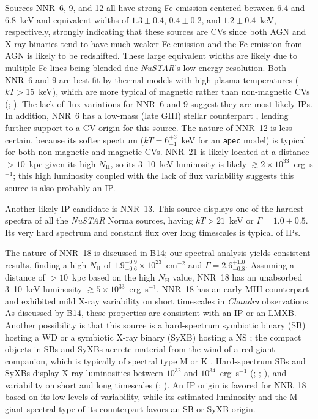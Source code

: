 \documentclass[iop,revtex4]{emulateapj}
\begin{document}
Sources NNR~6, 9, and 12 all have strong Fe emission centered between 6.4 and 6.8~keV and equivalent widths of $1.3\pm0.4$, $0.4\pm0.2$, and $1.2\pm0.4$~keV, respectively, strongly indicating that these sources are CVs since both AGN and X-ray binaries tend to have much weaker Fe emission and the Fe emission from AGN is likely to be redshifted.  These large equivalent widths are likely due to multiple Fe lines being blended due \textit{NuSTAR}'s low energy resolution.  Both NNR~6 and 9 are best-fit by thermal models with high plasma temperatures ($kT>15$~keV), which are more typical of magnetic rather than non-magnetic CVs (\citealt{landi09}; \citealt{xu16}).  The lack of flux variations for NNR~6 and 9 suggest they are most likely IPs.  In addition, NNR~6 has a low-mass (late GIII) stellar counterpart \citep{rahoui14}, lending further support to a CV origin for this source.  The nature of NNR~12 is less certain, because its softer spectrum ($kT = 6^{+3}_{-1}$~keV for an \texttt{apec} model) is typical for both non-magnetic and magnetic CVs.  NNR~21 is likely located at a distance $>10$~kpc given its high $N_{\mathrm{H}}$, so its 3--10~keV luminosity is likely $\gtrsim2\times10^{33}$~erg~s$^{-1}$; this high luminosity coupled with the lack of flux variability suggests this source is also probably an IP. \par   
Another likely IP candidate is NNR~13.  This source displays one of the hardest spectra of all the \textit{NuSTAR} Norma sources, having $kT>21$~keV or $\Gamma=1.0\pm0.5$.  Its very hard spectrum and constant flux over long timescales is typical of IPs. \par  
The nature of NNR~18 is discussed in B14; our spectral analysis yields consistent results, finding a high $N_{\mathrm{H}}$ of $1.9^{+0.9}_{-0.6}\times10^{23}$~cm$^{-2}$ and $\Gamma=2.6^{+1.0}_{-0.8}$.  Assuming a distance of $>10$~kpc based on the high $N_{\mathrm{H}}$ value, NNR~18 has an unabsorbed 3--10~keV luminosity $\gtrsim5\times10^{33}$~erg~s$^{-1}$.  NNR~18 has an early MIII counterpart and exhibited mild X-ray variability on short timescales in \textit{Chandra} observations.  As discussed by B14, these properties are consistent with an IP or an LMXB.  Another possibility is that this source is a hard-spectrum symbiotic binary (SB) hosting a WD or a symbiotic X-ray binary (SyXB) hosting a NS \citep{luna13}; the compact objects in SBs and SyXBs accrete material from the wind of a red giant companion, which is typically of spectral type M or K \citep{morihana16}.  Hard-spectrum SBs and SyXBs display X-ray luminosities between $10^{32}$ and $10^{34}$~erg~s$^{-1}$ (\citealt{masetti02}; \citealt{smith08}; \citealt{nespoli10}), and variability on short and long timescales (\citealt{luna07}; \citealt{corbet08}).  An IP origin is favored for NNR~18 based on its low levels of variability, while its estimated luminosity and the M giant spectral type of its counterpart favors an SB or SyXB origin.   \par  
\end{document}

